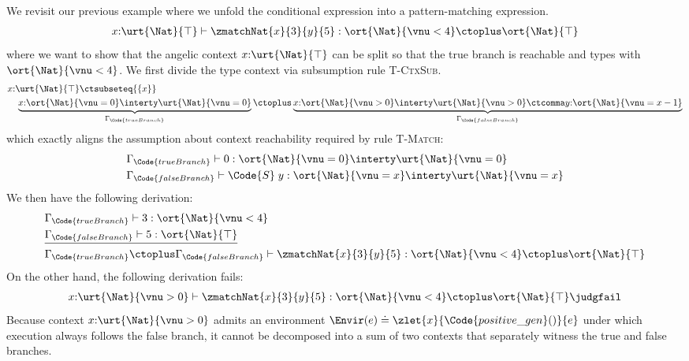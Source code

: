 \begin{example} We revisit our previous example where we unfold the conditional expression into a pattern-matching expression.
\begin{align*}
  x{:}\urt{\Nat}{\top} \vdash \zmatchNat{x}{3}{y}{5} : \ort{\Nat}{\vnu < 4} \ctoplus \ort{\Nat}{\top}
\end{align*}
where we want to show that the angelic context $x{:}\urt{\Nat}{\top}$ can be split so that
the true branch is reachable and types with $\ort{\Nat}{\vnu < 4}$.  We first divide the
type context via subsumption rule \textsc{T-CtxSub}.
{\small\begin{align*}
  &x{:}\urt{\Nat}{\top} \ctsubseteq{\{x\}}
  \\&\quad \underbrace{x{:}\ort{\Nat}{\vnu = 0}\interty \urt{\Nat}{\vnu = 0}}_{\Gamma_{\Code{trueBranch}}} \ctoplus \underbrace{x{:}\ort{\Nat}{\vnu > 0}\interty \urt{\Nat}{\vnu > 0} \ctcomma y{:}\ort{\Nat}{\vnu = x - 1}}_{\Gamma_{\Code{falseBranch}}}
\end{align*}}\noindent
which exactly aligns the assumption about context reachability required by rule \textsc{T-Match}:
\begin{align*}
  &\Gamma_{\Code{trueBranch}} \vdash 0 : \ort{\Nat}{\vnu = 0} \interty \urt{\Nat}{\vnu = 0}
  \\&\Gamma_{\Code{falseBranch}} \vdash \Code{S}\;y : \ort{\Nat}{\vnu = x} \interty \urt{\Nat}{\vnu = x}
\end{align*}\noindent
We then have the following derivation:
\begin{align*}
  &\Gamma_{\Code{trueBranch}} \vdash 3 : \ort{\Nat}{\vnu < 4}
  \\&\underline{\Gamma_{\Code{falseBranch}} \vdash 5 : \ort{\Nat}{\top}}
  \\&\Gamma_{\Code{trueBranch}} \ctoplus \Gamma_{\Code{falseBranch}} \vdash  \zmatchNat{x}{3}{y}{5} : \ort{\Nat}{\vnu < 4} \ctoplus \ort{\Nat}{\top}
\end{align*}\noindent
On the other hand, the following derivation fails:
\begin{align*}
  x{:}\urt{\Nat}{\vnu > 0} \vdash \zmatchNat{x}{3}{y}{5} : \ort{\Nat}{\vnu < 4} \ctoplus \ort{\Nat}{\top} \judgfail
\end{align*}\noindent
Because context $x{:}\urt{\Nat}{\vnu > 0}$ admits an environment $\Envir(e) \doteq \zlet{x}{\Code{positive\_gen}()}{e}$ under which execution always follows the false branch, it cannot be decomposed into a sum of two contexts that separately witness the true and false branches.

\end{example}
